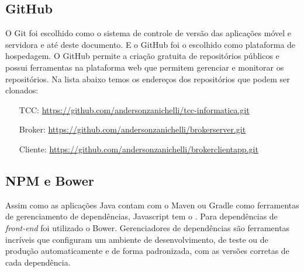 \subsection{GitHub}
O Git foi escolhido como o sistema de controle de versão das aplicações móvel e servidora e até deste documento. E o GitHub foi o escolhido como plataforma de hospedagem.
O GitHub permite a criação gratuita de repositórios públicos e possui ferramentas na plataforma web que permitem gerenciar e monitorar os repositórios.
Na lista abaixo temos os endereços dos repositórios que podem ser clonados:

\begin{itemize}
\item[TCC:] \url{https://github.com/andersonzanichelli/tcc-informatica.git}
\item[Broker:] \url{https://github.com/andersonzanichelli/brokerserver.git}
\item[Cliente:] \url{https://github.com/andersonzanichelli/brokerclientapp.git}
\end{itemize}

\subsection{NPM e Bower}
Assim como as aplicações Java contam com o Maven ou Gradle como ferramentas de gerenciamento de dependências, Javascript tem o . Para dependências de \textit{front-end} foi utilizado o Bower.
Gerenciadores de dependências são ferramentas incríveis que configuram um ambiente de desenvolvimento, de teste ou de produção automaticamente e de forma padronizada, com as versões corretas de cada dependência.